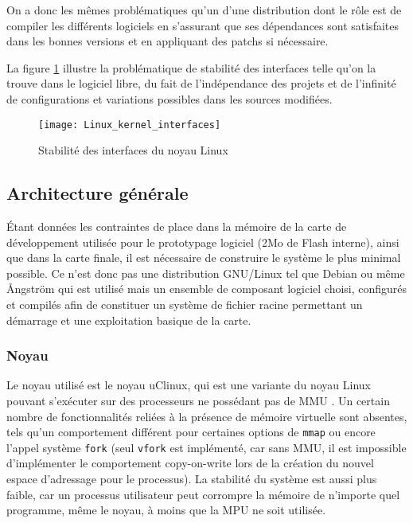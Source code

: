 On a donc les mêmes problématiques qu'un  d'une distribution dont le rôle est de compiler les différents logiciels en s'assurant que ses dépendances sont satisfaites dans les bonnes versions et en appliquant des patchs si nécessaire.
    
La figure \ref{LinuxAPIStability} illustre la problématique de stabilité des interfaces telle qu'on la trouve dans le logiciel libre, du fait de l'indépendance des projets et de l'infinité de configurations et variations possibles dans les sources modifiées.
\begin{figure}[H]
	\begin{center}
		\texttt{[image: Linux\_kernel\_interfaces]}
	\end{center}
	\caption{Stabilité des interfaces du noyau Linux}
	\label{LinuxAPIStability}
\end{figure}
    
\subsection{Architecture générale}
Étant données les contraintes de place dans la mémoire de la carte de développement utilisée pour le prototypage logiciel (2Mo de Flash interne), ainsi que dans la carte finale, il est nécessaire de construire le système le plus minimal possible.
Ce n'est donc pas une distribution GNU/Linux tel que Debian ou même Ångström qui est utilisé mais un ensemble de composant logiciel choisi, configurés et compilés afin de constituer un système de fichier racine permettant un démarrage et une exploitation basique de la carte.

\subsubsection{Noyau}
Le noyau utilisé est le noyau uClinux, qui est une variante du noyau Linux pouvant s'exécuter sur des processeurs ne possédant pas de \gls{MMU} \autocite{uClinuxLinuxDiff}.
Un certain nombre de fonctionnalités reliées à la présence de mémoire virtuelle sont absentes, tels qu'un comportement différent pour certaines options de \texttt{mmap} ou encore l'appel système \texttt{fork} (seul \texttt{vfork} est implémenté, car sans \gls{MMU}, il est impossible d'implémenter le comportement copy-on-write lors de la création du nouvel espace d'adressage pour le processus).
La stabilité du système est aussi plus faible, car un processus utilisateur peut corrompre la mémoire de n'importe quel programme, même le noyau, à moins que la \gls{MPU} ne soit utilisée.
				
